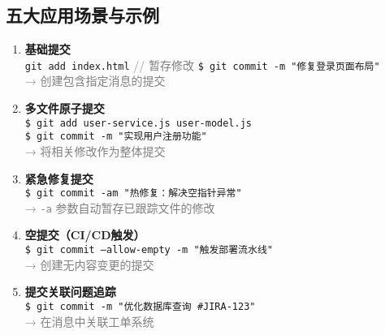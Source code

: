 \subsection{五大应用场景与示例}
\begin{enumerate}[leftmargin=*, nosep]
    \item \textbf{基础提交} \\ 
    \texttt{git add index.html} \quad \textcolor{gray}{// 暂存修改}  
    \texttt{\$ git commit -m "修复登录页面布局"} \\
    \textcolor{gray}{→ 创建包含指定消息的提交}
    
    \item \textbf{多文件原子提交} \\
    \texttt{\$ git add user-service.js user-model.js} \\
    \texttt{\$ git commit -m "实现用户注册功能"} \\
    \textcolor{gray}{→ 将相关修改作为整体提交}
    
    \item \textbf{紧急修复提交} \\
    \texttt{\$ git commit -am "热修复：解决空指针异常"} \\
    \textcolor{gray}{→ \texttt{-a} 参数自动暂存已跟踪文件的修改}
    
    \item \textbf{空提交（CI/CD触发）} \\
    \texttt{\$ git commit --allow-empty -m "触发部署流水线"} \\
    \textcolor{gray}{→ 创建无内容变更的提交}
    
    \item \textbf{提交关联问题追踪} \\
    \texttt{\$ git commit -m "优化数据库查询 \#JIRA-123"} \\
    \textcolor{gray}{→ 在消息中关联工单系统}
\end{enumerate}

